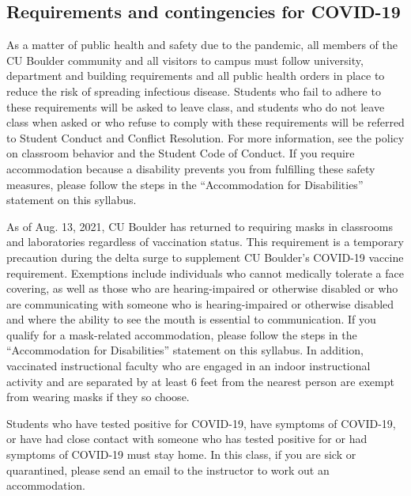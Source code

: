\subsection{Requirements and contingencies for COVID-19}
As a matter of public health and safety due to the pandemic, all members of the CU Boulder community and all visitors to campus must follow university, department and building requirements and all public health orders in place to reduce the risk of spreading infectious disease. Students who fail to adhere to these requirements will be asked to leave class, and students who do not leave class when asked or who refuse to comply with these requirements will be referred to Student Conduct and Conflict Resolution. For more information, see the policy on classroom behavior and the Student Code of Conduct. If you require accommodation because a disability prevents you from fulfilling these safety measures, please follow the steps in the “Accommodation for Disabilities” statement on this syllabus.

As of Aug. 13, 2021, CU Boulder has returned to requiring masks in classrooms and laboratories regardless of vaccination status. This requirement is a temporary precaution during the delta surge to supplement CU Boulder’s COVID-19 vaccine requirement. Exemptions include individuals who cannot medically tolerate a face covering, as well as those who are hearing-impaired or otherwise disabled or who are communicating with someone who is hearing-impaired or otherwise disabled and where the ability to see the mouth is essential to communication. If you qualify for a mask-related accommodation, please follow the steps in the “Accommodation for Disabilities” statement on this syllabus. In addition, vaccinated instructional faculty who are engaged in an indoor instructional activity and are separated by at least 6 feet from the nearest person are exempt from wearing masks if they so choose.

Students who have tested positive for COVID-19, have symptoms of COVID-19, or have had close contact with someone who has tested positive for or had symptoms of COVID-19 must stay home. In this class, if you are sick or quarantined, please send an email to the instructor to work out an accommodation.